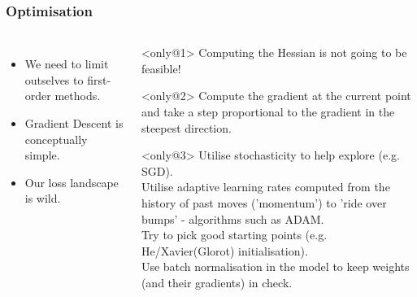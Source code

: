 \documentclass[\beamerclass,aspectratio=1610]{beamer}
\begin{document}
\begin{frame}
	\frametitle{Optimisation}

	\begin{columns}
	\begin{itemize}
		\item<1> We need to limit outselves to first-order methods.
		\item<2> Gradient Descent is conceptually simple.
		\item<3> Our loss landscape is wild.
	\end{itemize}
	\begin{overprint}
		\begin{block}{}<only@1>
			Computing the Hessian is not going to be feasible!
		\end{block}
		\begin{block}{}<only@2>
			Compute the gradient at the current point and take a step proportional to the gradient in the steepest direction.
		\end{block}
		\begin{block}{}<only@3>
			Utilise stochasticity to help explore (e.g. SGD).
			\\[0.5em]
			Utilise adaptive learning rates computed from the history of past moves ('momentum') to 'ride over bumps' - algorithms such as ADAM.
			\\[0.5em]
			Try to pick good starting points (e.g. He/Xavier(Glorot) initialisation).
			\\[0.5em]
			Use batch normalisation in the model to keep weights (and their gradients) in check.
		\end{block}
	\end{overprint}
	\end{columns}
\end{frame}
\end{document}
